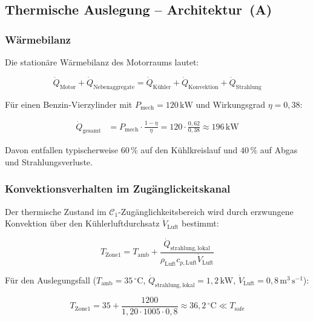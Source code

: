 ﻿\documentclass[12pt,a4paper]{article}
\begin{document}
\subsection{Thermische Auslegung -- Architektur~(A)}

\subsubsection{Wärmebilanz}

Die stationäre Wärmebilanz des Motorraums lautet:

\begin{equation}
	\dot{Q}_\mathrm{Motor} + \dot{Q}_\mathrm{Nebenaggregate}
	= \dot{Q}_\mathrm{Kühler} + \dot{Q}_\mathrm{Konvektion}
	+ \dot{Q}_\mathrm{Strahlung}
	\label{eq:waermebilanz_a}
\end{equation}

Für einen Benzin-Vierzylinder mit $P_\mathrm{mech} = 120\,\mathrm{kW}$ und
Wirkungsgrad $\eta = 0{,}38$:

\begin{align}
	\dot{Q}_\mathrm{gesamt} &= P_\mathrm{mech} \cdot \frac{1 - \eta}{\eta}
	= 120 \cdot \frac{0{,}62}{0{,}38} \approx 196\,\mathrm{kW}
	\label{eq:waerme_benzin}
\end{align}

Davon entfallen typischerweise $60\,\%$ auf den Kühlkreislauf und
$40\,\%$ auf Abgas und Strahlungsverluste.

\subsubsection{Konvektionsverhalten im Zugänglickeitskanal}

Der thermische Zustand im $\mathcal{C}_1$-Zugänglichkeitsbereich wird durch
erzwungene Konvektion über den Kühlerluftdurchsatz $\dot{V}_\mathrm{Luft}$ bestimmt:

\begin{equation}
	T_\mathrm{Zone1} = T_\mathrm{amb} + \frac{\dot{Q}_\mathrm{strahlung,lokal}}
	{\rho_\mathrm{Luft} c_{p,\mathrm{Luft}} \dot{V}_\mathrm{Luft}}
	\label{eq:temp_zone1}
\end{equation}

Für den Auslegungsfall ($T_\mathrm{amb} = 35\,^\circ\mathrm{C}$,
$\dot{Q}_\mathrm{strahlung,lokal} = 1{,}2\,\mathrm{kW}$,
$\dot{V}_\mathrm{Luft} = 0{,}8\,\mathrm{m^3\,s^{-1}}$):

\begin{equation}
	T_\mathrm{Zone1} = 35 + \frac{1200}{1{,}20 \cdot 1005 \cdot 0{,}8}
	\approx 36{,}2\,^\circ\mathrm{C} \ll T_\mathrm{safe}
	\label{eq:temp_zone1_num}
\end{equation}
\end{document}
